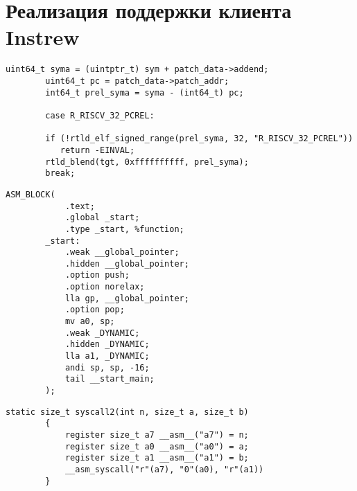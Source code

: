 
\section{Реализация поддержки клиента Instrew}
\begin{lstlisting}[caption={Релокация}, frame=single, breaklines, basicstyle=\footnotesize]
        uint64_t syma = (uintptr_t) sym + patch_data->addend;
        uint64_t pc = patch_data->patch_addr;
        int64_t prel_syma = syma - (int64_t) pc;

        case R_RISCV_32_PCREL:

        if (!rtld_elf_signed_range(prel_syma, 32, "R_RISCV_32_PCREL"))
           return -EINVAL;
        rtld_blend(tgt, 0xffffffffff, prel_syma);
        break;
    \end{lstlisting}

\begin{lstlisting}[caption={Заголовок}, frame=single, breaklines, basicstyle=\footnotesize]
        ASM_BLOCK(
            .text;
            .global _start;
            .type _start, %function;
        _start:
            .weak __global_pointer;
            .hidden __global_pointer;
            .option push;
            .option norelax;
            lla gp, __global_pointer;
            .option pop;
            mv a0, sp;
            .weak _DYNAMIC;
            .hidden _DYNAMIC;
            lla a1, _DYNAMIC;
            andi sp, sp, -16;
            tail __start_main;
        );
\end{lstlisting}

\begin{lstlisting}[caption={Системный вызов}, frame=single, breaklines, basicstyle=\footnotesize]
        static size_t syscall2(int n, size_t a, size_t b)
        {
            register size_t a7 __asm__("a7") = n;
            register size_t a0 __asm__("a0") = a;
            register size_t a1 __asm__("a1") = b;
            __asm_syscall("r"(a7), "0"(a0), "r"(a1))
        }
\end{lstlisting}
